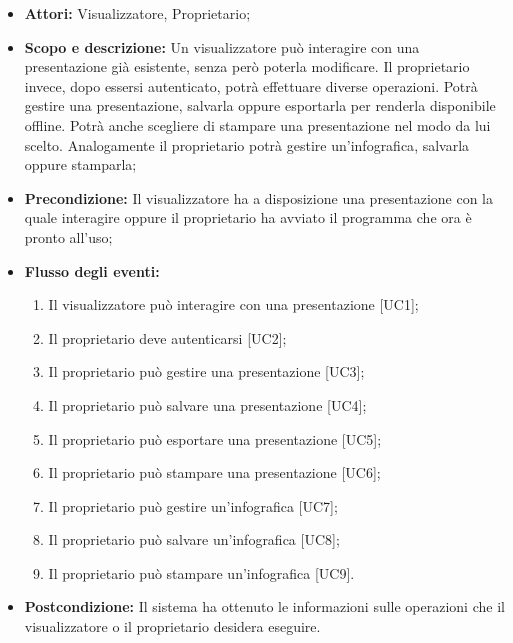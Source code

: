 \begin{itemize}
	\item \textbf{Attori:} Visualizzatore, Proprietario;
	\item \textbf{Scopo e descrizione:} Un visualizzatore può interagire con una presentazione già esistente, senza però poterla modificare. Il proprietario invece, dopo essersi autenticato, potrà effettuare diverse operazioni. Potrà gestire una presentazione, salvarla oppure esportarla per renderla disponibile offline. Potrà anche scegliere di stampare una presentazione nel modo da lui scelto. Analogamente il proprietario potrà gestire un'\gls{infografica}, salvarla oppure stamparla;
	\item \textbf{Precondizione:} Il visualizzatore ha a disposizione una presentazione con la quale interagire oppure il proprietario ha avviato il programma che ora è pronto all'uso;
	\item \textbf{Flusso degli eventi:}
	\begin{enumerate}
		\item Il visualizzatore può interagire con una presentazione [UC1];
		\item Il proprietario deve autenticarsi [UC2];
		\item Il proprietario può gestire una presentazione [UC3];
		\item Il proprietario può salvare una presentazione [UC4];
		\item Il proprietario può esportare una presentazione [UC5];
		\item Il proprietario può stampare una presentazione [UC6];
		\item Il proprietario può gestire un'\gls{infografica} [UC7];
		\item Il proprietario può salvare un'\gls{infografica} [UC8];
		\item Il proprietario può stampare un'\gls{infografica} [UC9].
	\end{enumerate}
	\item \textbf{Postcondizione:} Il sistema ha ottenuto le informazioni sulle operazioni che il visualizzatore o il proprietario desidera eseguire.
\end{itemize}



















